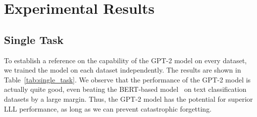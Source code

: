 \documentclass{article} %
\begin{document}
\section{Experimental Results}

\subsection{Single Task}
To establish a reference on the capability of the GPT-2 model on every dataset, we trained the model on each dataset independently.
The results are shown in Table~\ref{tab:single_task}.
We observe that the performance of the GPT-2 model is actually quite good, even beating the BERT-based model~\citep{d2019episodic} on text classification datasets by a large margin.
Thus, the GPT-2 model has the potential for superior LLL performance, as long as we can prevent catastrophic forgetting.



\end{document}
